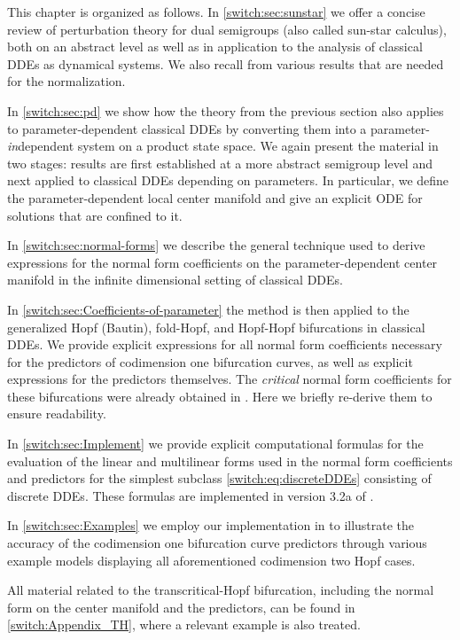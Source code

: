 This chapter is organized as follows. In \cref{switch:sec:sunstar} we offer a concise review of perturbation theory for dual semigroups (also called sun-star calculus), both on an abstract level as well as in application to the analysis of classical DDEs as dynamical systems. We also recall from \cite{Janssens:Thesis} various results that are needed for the normalization.

In \cref{switch:sec:pd} we show how the theory from the previous section also applies to parameter-dependent classical DDEs by converting them into a parameter-\emph{in}dependent system on a product state space. We again present the material in two stages: results are first established at a more abstract semigroup level and next applied to classical DDEs depending on parameters. In particular, we define the parameter-dependent local center manifold and give an explicit ODE for solutions that are confined to it.

In \cref{switch:sec:normal-forms} we describe the general technique used to derive expressions for the normal form coefficients on the parameter-dependent center manifold in the infinite dimensional setting of classical DDEs.

In \cref{switch:sec:Coefficients-of-parameter} the method is then applied to the generalized Hopf (Bautin), fold-Hopf, and Hopf-Hopf bifurcations in classical DDEs. We provide explicit expressions for all normal form coefficients necessary for the predictors of codimension one bifurcation curves, as well as explicit expressions for the predictors themselves. The \emph{critical} normal form coefficients for these bifurcations were already obtained in \cite{Janssens:Thesis}. Here we briefly re-derive them to ensure readability.

In \cref{switch:sec:Implement} we provide explicit computational formulas for the evaluation of the linear and multilinear forms used in the normal form coefficients and predictors for the simplest subclass \cref{switch:eq:discreteDDEs} consisting of discrete DDEs. These formulas are implemented in version 3.2a of \DDEBIFTOOL.

In \cref{switch:sec:Examples} we employ our implementation in \DDEBIFTOOL to illustrate the accuracy of the codimension one bifurcation curve predictors through various example models displaying all aforementioned codimension two Hopf cases. 

All material related to the transcritical-Hopf bifurcation, including the normal form on the center manifold and the predictors, can be found in \cref{switch:Appendix_TH}, where a relevant example is also treated.


